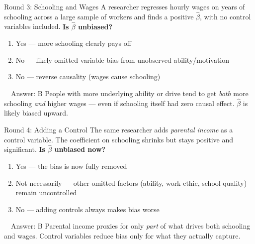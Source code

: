 \documentclass[11pt,aspectratio=169]{beamer}
\begin{document}
\begin{frame}{Round 3: Schooling and Wages}
  \small
  A researcher regresses hourly wages on years of schooling across a large sample of workers and finds a positive \(\hat\beta\), with no control variables included.
  \vspace{0.5em}
  \textbf{Is \(\hat\beta\) unbiased?}
  \begin{enumerate}
    \item[\textbf{A}] Yes --- more schooling clearly pays off
    \item[\textbf{B}] No --- likely omitted-variable bias from unobserved ability/motivation
    \item[\textbf{C}] No --- reverse causality (wages cause schooling)
  \end{enumerate}
  \pause
  \vspace{0.3em}
  \begin{alertblock}{\faCheckCircle\ \ Answer: B}
    People with more underlying ability or drive tend to get \emph{both} more schooling \emph{and} higher wages --- even if schooling itself had zero causal effect. \(\hat\beta\) is likely biased upward.
  \end{alertblock}
\end{frame}

\begin{frame}{Round 4: Adding a Control}
  \small
  The same researcher adds \emph{parental income} as a control variable. The coefficient on schooling shrinks but stays positive and significant.
  \vspace{0.5em}
  \textbf{Is \(\hat\beta\) unbiased now?}
  \begin{enumerate}
    \item[\textbf{A}] Yes --- the bias is now fully removed
    \item[\textbf{B}] Not necessarily --- other omitted factors (ability, work ethic, school quality) remain uncontrolled
    \item[\textbf{C}] No --- adding controls always makes bias worse
  \end{enumerate}
  \pause
  \vspace{0.3em}
  \begin{alertblock}{\faCheckCircle\ \ Answer: B}
    Parental income proxies for only \emph{part} of what drives both schooling and wages. Control variables reduce bias only for what they actually capture.
  \end{alertblock}
\end{frame}
\end{document}
